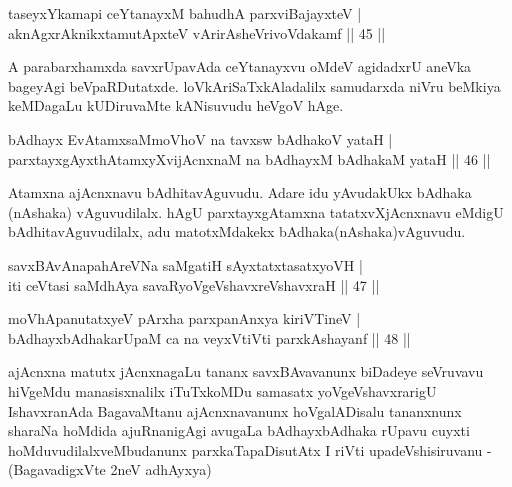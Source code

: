 \begin{shl}
taseyxYkamapi ceYtanayxM bahudhA parxviBajayxteV |\\
aknAgxrAknikxtamutApxteV vArirAsheVrivoVdakamf \hfill || 45 ||
\end{shl}

\begin{artha}
A parabarxhamxda savxrUpavAda ceYtanayxvu oMdeV agidadxrU aneVka bageyAgi beVpaRDutatxde. loVkAriSaTxkAladalilx samudarxda niVru beMkiya keMDagaLu kUDiruvaMte kANisuvudu heVgoV hAge.
\end{artha}


\begin{shl}
bAdhayx EvA\s \s tamxsaMmoVhoV na tavxsw bAdhakoV yataH |\\
parxtayxgAyxthAtamxyXvijAcnxnaM na bAdhayxM bAdhakaM yataH \hfill || 46 ||
\end{shl}

\begin{artha}
Atamxna ajAcnxnavu bAdhitavAguvudu. Adare idu yAvudakUkx bAdhaka (nAshaka) vAguvudilalx. hAgU parxtayxgAtamxna tatatxvXjAcnxnavu eMdigU bAdhitavAguvudilalx, adu matotxMdakekx bAdhaka\break (nAshaka)vAguvudu.
\end{artha}

\begin{shl}
savxBAvAnapahAreVNa saMgatiH sAyxtatxtasatxyoVH |\\
iti ceVtasi saMdhAya savaRyoVgeVshavxreVshavxraH \hfill || 47 ||
\end{shl}

\begin{shl}
moVhApanutatxyeV pArxha parxpanAnxya kiriVTineV |\\
bAdhayxbAdhakarUpaM ca na veyxVtiVti parxkAshayanf \hfill || 48 ||
\end{shl}

\begin{artha}
ajAcnxna matutx jAcnxnagaLu tananx savxBAvavanunx biDadeye seVruvavu hiVgeMdu manasisxnalilx iTuTxkoMDu samasatx yoVgeVshavxrarigU IshavxranAda BagavaMtanu ajAcnxnavanunx hoVgalADisalu tananxnunx sharaNa hoMdida ajuRnanigAgi avugaLa bAdhayxbAdhaka rUpavu cuyxti hoMduvudilalxveMbudanunx parxkaTapaDisutAtx I riVti upadeVshisiruvanu -(BagavadigxVte 2neV adhAyxya)
\end{artha}

